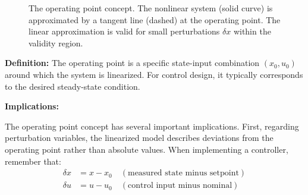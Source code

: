 \begin{figure}[htbp]
\centering
{}
\caption{The operating point concept. The nonlinear system (solid curve) is approximated by a tangent line (dashed) at the operating point. The linear approximation is valid for small perturbations $\delta x$ within the validity region.}
\label{fig:operating_point}
\end{figure}

\textbf{Definition:} The operating point is a specific state-input combination $(x_0, u_0)$ around which the system is linearized. For control design, it typically corresponds to the desired steady-state condition.

\textbf{Implications:}

The operating point concept has several important implications. First, regarding perturbation variables, the linearized model describes deviations from the operating point rather than absolute values. When implementing a controller, remember that:
\begin{align}
\delta x &= x - x_0 \quad (\text{measured state minus setpoint}) \\
\delta u &= u - u_0 \quad (\text{control input minus nominal})
\end{align}

